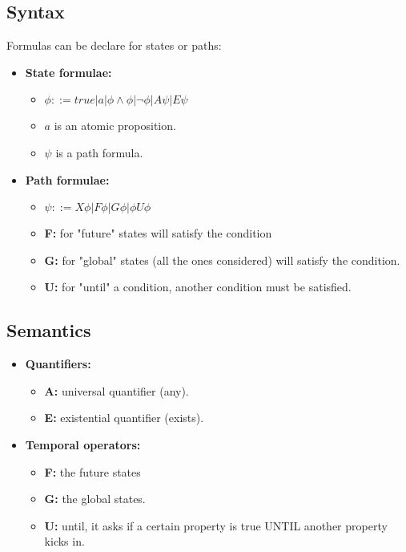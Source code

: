 \subsection{Syntax}
Formulas can be declare for states or paths:
\begin{itemize}
    \item \textbf{State formulae:}
        \begin{itemize}
            \item $\phi ::= true | a | \phi \land \phi | \lnot \phi | A \psi | E \psi$
            \item $a$ is an atomic proposition.
            \item $\psi$ is a path formula.
        \end{itemize}

    \item \textbf{Path formulae:}
        \begin{itemize}
            \item $\psi ::= X \phi | F \phi | G\phi | \phi U \phi$
            \item \textbf{F:} for "future" states will satisfy the condition
            \item \textbf{G:} for "global" states (all the ones considered) will satisfy the condition.
            \item \textbf{U:} for "until" a condition, another condition must be satisfied.
        \end{itemize}
\end{itemize}

\subsection{Semantics}

\begin{itemize}
    \item \textbf{Quantifiers:}
        \begin{itemize}
            \item \textbf{A:} universal quantifier (any).
            \item \textbf{E:} existential quantifier (exists).
        \end{itemize}
    \item \textbf{Temporal operators:}
        \begin{itemize}
            \item \textbf{F:} the future states
            \item \textbf{G:} the global states.
            \item \textbf{U:} until, it asks if a certain property is true UNTIL another property kicks in.
        \end{itemize}
\end{itemize}

